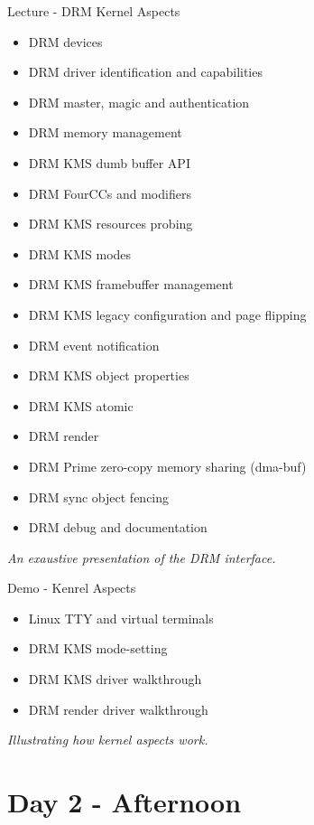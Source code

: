 \documentclass[a4paper,12pt,obeyspaces,spaces,hyphens]{article}
\begin{document}
\feagendatwocolumn
{Lecture - DRM Kernel Aspects}
{
  \begin{itemize}
  \item DRM devices
  \item DRM driver identification and capabilities
  \item DRM master, magic and authentication
  \item DRM memory management
  \item DRM KMS dumb buffer API
  \item DRM FourCCs and modifiers
  \item DRM KMS resources probing
  \item DRM KMS modes
  \item DRM KMS framebuffer management
  \item DRM KMS legacy configuration and page flipping
  \item DRM event notification
  \item DRM KMS object properties
  \item DRM KMS atomic
  \item DRM render
  \item DRM Prime zero-copy memory sharing (dma-buf)
  \item DRM sync object fencing
  \item DRM debug and documentation
  \end{itemize}
  \vspace{0.5em}
  {\em An exaustive presentation of the DRM interface.}
}
{Demo - Kenrel Aspects}
{
  \begin{itemize}
  \item Linux TTY and virtual terminals
  \item DRM KMS mode-setting
  \item DRM KMS driver walkthrough
  \item DRM render driver walkthrough
  \end{itemize}
  \vspace{0.5em}
  {\em Illustrating how kernel aspects work.}
}

\section{Day 2 - Afternoon}
\end{document}
